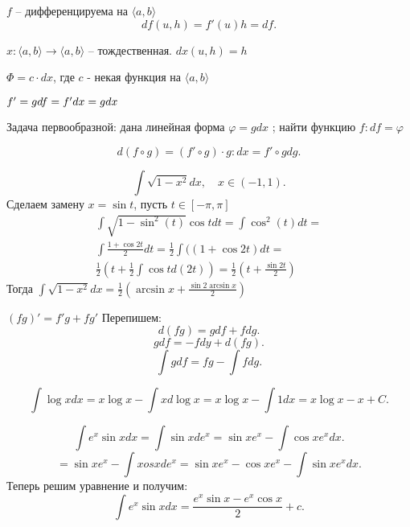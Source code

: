\documentclass[11pt]{book}
\begin{document}
\begin{defn}[дифференциал]
    $ f $ -- дифференцируема на $ \langle a, b \rangle$
    \[
	df(u, h) = f'(u) h = df
    .\]
\end{defn}
\begin{ex}
    $ x: \langle a, b \rangle \to  \langle a, b \rangle$ -- тождественная. $ dx (u, h)= h$
\end{ex}
\begin{st}
    $ \Phi = c \cdot dx$, где  $ c$ - некая функция на $ \langle a, b \rangle$
\end{st}
$ f' = g \\
df = f' dx = g dx$

Задача первообразной: дана линейная форма $ \varphi = g dx$ ; найти функцию $ f: df = \varphi $
\begin{st}
    \[
	d(f \circ g) = (f' \circ g) \cdot g: dx = f' \circ g dg
    .\]
\end{st}
\begin{ex}
    \[
	\int \sqrt{1 - x^2} dx, \quad x \in  (-1, 1)
    .\]
    Сделаем замену $ x = \sin t$, пусть $ t \in  [- \pi , \pi]$
    $$
    \begin{array}{c}
	\int \sqrt{1-\sin^2(t)} \cos t dt = \int \cos^2(t) dt =\\
	\int \frac{1 + \cos 2t}{2} dt = \frac{1}{2} \int ((1 + \cos 2t) dt = \\
	\frac{1}{2}(t + \frac{1}{2} \int \cos t d(2t)) = \frac{1}{2} (t + \frac{\sin
	2 t}{2})
    \end{array}
    $$
    Тогда $ \int \sqrt{1 - x^2} dx = \frac{1}{2} (\arcsin x + \frac{\sin 2 \arcsin x}{2})$
\end{ex}
\begin{st}

    $ (fg)' = f'g + fg'$
    Перепишем:
    \[
	d(fg) = g df + f dg
    .\]
    \[
	g df = -f dy + d(fg)
    .\]
    \[
	\int g df = fg - \int f dg
    .\]
\end{st}
\begin{ex}
    \[
	\int \log x dx = x \log x - \int x d \log x = x \log x - \int 1 dx = x \log x -x + C
    .\]
\end{ex}
\begin{ex}
    \[
	\int e^{x} \sin x dx = \int \sin x d e^{x} = \sin x e^{ x} - \int \cos x e^{x} dx
    .\]
    \[
	= \sin x e^{x} - \int xos x d e^{x} = \sin x e^{x} - \cos x e^{ x} - \int \sin x e ^{x} dx
    .\]
    Теперь решим уравнение и получим:
    \[
	\int e^{x} \sin x dx = \frac{e^{x} \sin x - e^{x} \cos x}{2} + c
    .\]
\end{ex}
\end{document}
